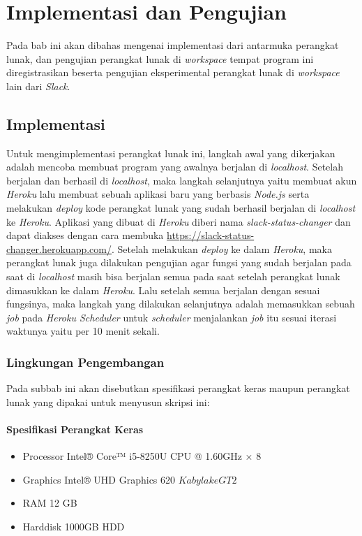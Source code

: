 \chapter{Implementasi dan Pengujian}
\label{chap:implementasi dan pengujian}

Pada bab ini akan dibahas mengenai implementasi dari antarmuka perangkat lunak, dan pengujian perangkat lunak di \textit{workspace} tempat program ini diregistrasikan beserta pengujian eksperimental perangkat lunak di \textit{workspace} lain dari \textit{Slack}.

\section{Implementasi}
 Untuk mengimplementasi perangkat lunak ini, langkah awal yang dikerjakan adalah mencoba membuat program yang awalnya berjalan di \textit{localhost}. Setelah berjalan dan berhasil di \textit{localhost}, maka langkah selanjutnya yaitu membuat akun \textit{Heroku} lalu membuat sebuah aplikasi baru yang berbasis \textit{Node.js} serta melakukan \textit{deploy} kode perangkat lunak yang sudah berhasil berjalan di \textit{localhost} ke \textit{Heroku}. Aplikasi yang dibuat di \textit{Heroku} diberi nama \textit{slack-status-changer} dan dapat diakses dengan cara membuka \url{https://slack-status-changer.herokuapp.com/}. Setelah melakukan \textit{deploy} ke dalam \textit{Heroku}, maka perangkat lunak juga dilakukan pengujian agar fungsi yang sudah berjalan pada saat di \textit{localhost} masih bisa berjalan semua pada saat setelah perangkat lunak dimasukkan ke dalam \textit{Heroku}. Lalu setelah semua berjalan dengan sesuai fungsinya, maka langkah yang dilakukan selanjutnya adalah memasukkan sebuah \textit{job} pada \textit{Heroku Scheduler} untuk \textit{scheduler} menjalankan \textit{job} itu sesuai iterasi waktunya yaitu per 10 menit sekali. 
 
\subsection{Lingkungan Pengembangan}
 Pada subbab ini akan disebutkan spesifikasi perangkat keras maupun perangkat lunak yang dipakai untuk menyusun skripsi ini:
\subsubsection{Spesifikasi Perangkat Keras}
\begin{itemize}
    \item Processor Intel® Core™ i5-8250U CPU @ 1.60GHz × 8 
    \item Graphics Intel® UHD Graphics 620 \(Kabylake GT2\)
    \item RAM 12 GB
    \item Harddisk 1000GB HDD
\end{itemize}
